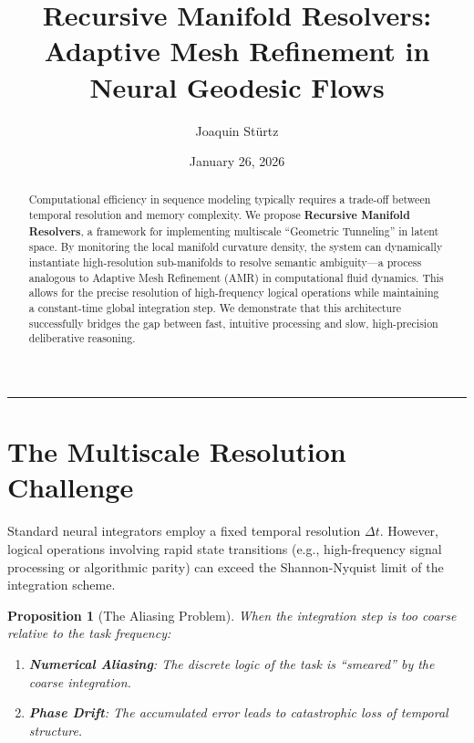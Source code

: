 \documentclass[12pt,letterpaper,twoside]{article}
\title{\textbf{Recursive Manifold Resolvers: Adaptive Mesh Refinement in Neural Geodesic Flows}}
\author{Joaquin Stürtz}
\date{January 26, 2026}
\newtheorem{prop}{Proposition}[section]
\begin{document}
\maketitle
\thispagestyle{empty}

\vspace{0.5cm}

\begin{abstract}
Computational efficiency in sequence modeling typically requires a trade-off between temporal resolution and memory complexity. We propose \textbf{Recursive Manifold Resolvers}, a framework for implementing multiscale ``Geometric Tunneling'' in latent space. By monitoring the local manifold curvature density, the system can dynamically instantiate high-resolution sub-manifolds to resolve semantic ambiguity---a process analogous to Adaptive Mesh Refinement (AMR) in computational fluid dynamics. This allows for the precise resolution of high-frequency logical operations while maintaining a constant-time global integration step. We demonstrate that this architecture successfully bridges the gap between fast, intuitive processing and slow, high-precision deliberative reasoning.
\end{abstract}

\vspace{0.5cm}
\hrule
\vspace{0.5cm}

\tableofcontents
\newpage

\section{The Multiscale Resolution Challenge}

Standard neural integrators employ a fixed temporal resolution $\Delta t$. However, logical operations involving rapid state transitions (e.g., high-frequency signal processing or algorithmic parity) can exceed the Shannon-Nyquist limit of the integration scheme.

\begin{prop}[The Aliasing Problem]
When the integration step is too coarse relative to the task frequency:
\begin{enumerate}
\item \textbf{Numerical Aliasing}: The discrete logic of the task is ``smeared'' by the coarse integration.
\item \textbf{Phase Drift}: The accumulated error leads to catastrophic loss of temporal structure.
\end{enumerate}
\end{prop}
\end{document}
